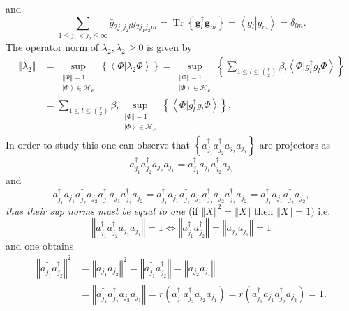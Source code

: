 \documentclass[aps,preprint]{revtex4}%
\begin{document}
and
\begin{equation}
\sum_{1\leq j_{1}<j_{2}\leq\infty}\bar{g}_{2j_{1}j_{2}l}g_{2j_{1}j_{2}%
m}=\operatorname*{Tr}\left\{  \mathbf{g}_{l}^{\dagger}\mathbf{g}_{m}\right\}
=\left\langle g_{l}\left\vert g_{m}\right.  \right\rangle =\delta_{lm}.
\end{equation}
The operator norm of $\lambda_{2},\lambda_{2}\geq0$ is given by
\begin{align}
\left\Vert \lambda_{2}\right\Vert  &  =\sup_{\substack{\left\Vert
\Phi\right\Vert =1\\\left\vert \Phi\right\rangle \in\mathcal{H}_{F}}}\left\{
\left\langle \left.  \Phi\right\vert \lambda_{2}\Phi\right\rangle \right\}
=\sup_{\substack{\left\Vert \Phi\right\Vert =1\\\left\vert \Phi\right\rangle
\in\mathcal{H}_{F}}}\left\{  \sum_{1\leq l\leq\binom{r}{2}}\beta
_{l}\left\langle \left.  \Phi\right\vert g_{l}^{\dagger}g_{l}\Phi\right\rangle
\right\} \\
&  =\sum_{1\leq l\leq\binom{r}{2}}\beta_{l}\sup_{\substack{\left\Vert
\Phi\right\Vert =1\\\left\vert \Phi\right\rangle \in\mathcal{H}_{F}}}\left\{
\left\langle \left.  \Phi\right\vert g_{l}^{\dagger}g_{l}\Phi\right\rangle
\right\}  .
\end{align}
In order to study this one can observe that $\left\{  a_{j_{1}}^{\dagger
}a_{j_{2}}^{\dagger}a_{j_{2}}a_{j_{1}}\right\}  $ are projectors as
\begin{equation}
a_{j_{1}}^{\dagger}a_{j_{2}}^{\dagger}a_{j_{2}}a_{j_{1}}=a_{j_{1}}^{\dagger
}a_{j_{1}}a_{j_{2}}^{\dagger}a_{j_{2}}%
\end{equation}
and
\begin{equation}
a_{j_{1}}^{\dagger}a_{j_{1}}a_{j_{2}}^{\dagger}a_{j_{2}}a_{j_{1}}^{\dagger
}a_{j_{1}}a_{j_{2}}^{\dagger}a_{j_{2}}=a_{j_{1}}^{\dagger}a_{j_{1}}a_{j_{1}%
}^{\dagger}a_{j_{1}}a_{j_{2}}^{\dagger}a_{j_{2}}a_{j_{2}}^{\dagger}a_{j_{2}%
}=a_{j_{1}}^{\dagger}a_{j_{1}}a_{j_{2}}^{\dagger}a_{j_{2}},
\end{equation}
\emph{thus their sup norms must be equal to one }(if $\left\Vert X\right\Vert
^{2}=\left\Vert X\right\Vert $ then $\left\Vert X\right\Vert =1)$ i.e.
\begin{equation}
\left\Vert a_{j_{1}}^{\dagger}a_{j_{2}}^{\dagger}a_{j_{2}}a_{j_{1}}\right\Vert
=1\Leftrightarrow\left\Vert a_{j_{1}}^{\dagger}a_{j_{2}}^{\dagger}\right\Vert
=\left\Vert a_{j_{2}}a_{j_{1}}\right\Vert =1
\end{equation}
and one obtains%
\begin{align}
\left\Vert a_{j_{1}}^{\dagger}a_{j_{2}}^{\dagger}\right\Vert ^{2}  &
=\left\Vert a_{j_{1}}a_{j_{2}}\right\Vert ^{2}=\left\Vert a_{j_{1}}^{\dagger
}a_{j_{2}}^{\dagger}\right\Vert =\left\Vert a_{j_{2}}a_{j_{1}}\right\Vert
\nonumber\\
&  =\left\Vert a_{j_{1}}^{\dagger}a_{j_{2}}^{\dagger}a_{j_{2}}a_{j_{1}%
}\right\Vert =r\left(  a_{j_{1}}^{\dagger}a_{j_{2}}^{\dagger}a_{j_{2}}%
a_{j_{1}}\right)  =r\left(  a_{j_{1}}^{\dagger}a_{j_{1}}a_{j_{2}}^{\dagger
}a_{j_{2}}\right)  =1.
\end{align}
\end{document}
